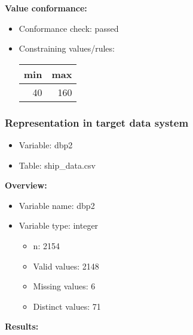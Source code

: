 \documentclass[
]{article}
\providecommand{\tightlist}{%
  \setlength{\itemsep}{0pt}\setlength{\parskip}{0pt}}
\begin{document}
\textbf{Value conformance:}

\begin{itemize}
\tightlist
\item
  Conformance check: passed
\item
  Constraining values/rules:

  \begin{table}[H]
  \centering
  \begin{tabular}{r|r}
  \hline
  \textbf{min} & \textbf{max}\\
  \hline
  40 & 160\\
  \hline
  \end{tabular}
  \end{table}
\end{itemize}

\newpage

\hypertarget{representation-in-target-data-system-4}{%
\subsubsection{\texorpdfstring{Representation in \textbf{target} data
system}{Representation in target data system}}\label{representation-in-target-data-system-4}}

\begin{itemize}
\tightlist
\item
  Variable: dbp2
\item
  Table: ship\_data.csv
\end{itemize}

\textbf{Overview:}

\begin{itemize}
\tightlist
\item
  Variable name: dbp2
\item
  Variable type: integer

  \begin{itemize}
  \tightlist
  \item
    n: 2154
  \item
    Valid values: 2148
  \item
    Missing values: 6
  \item
    Distinct values: 71
  \end{itemize}
\end{itemize}

\textbf{Results:}\\
\end{document}
